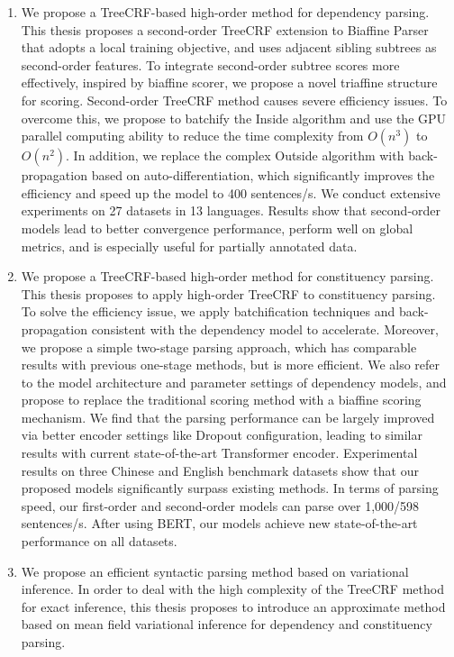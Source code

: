 \begin{eabstract}
	\begin{enumerate}
		\item We propose a TreeCRF-based high-order method for dependency parsing.
		      This thesis proposes a second-order TreeCRF extension to Biaffine Parser that adopts a local training objective, and uses adjacent sibling subtrees as second-order features.
		      To integrate second-order subtree scores more effectively, inspired by biaffine scorer, we propose a novel triaffine structure for scoring.
		      Second-order TreeCRF method causes severe efficiency issues.
		      To overcome this, we propose to batchify the Inside algorithm and use the GPU parallel computing ability to reduce the time complexity from $O(n^3)$ to $O(n^2)$.
		      In addition, we replace the complex Outside algorithm with back-propagation based on auto-differentiation, which significantly improves the efficiency and speed up the model to 400 sentences/s.
		      We conduct extensive experiments on 27 datasets in 13 languages.
		      Results show that second-order models lead to better convergence performance, perform well on global metrics, and is especially useful for partially annotated data.
		\item We propose a TreeCRF-based high-order method for constituency parsing.
		      This thesis proposes to apply high-order TreeCRF to constituency parsing.
		      To solve the efficiency issue, we apply batchification techniques and back-propagation consistent with the dependency model to accelerate.
		      Moreover, we propose a simple two-stage parsing approach, which has comparable results with previous one-stage methods, but is more efficient.
		      We also refer to the model architecture and parameter settings of dependency models, and propose to replace the traditional scoring method with a biaffine scoring mechanism.
		      We find that the parsing performance can be largely improved via better encoder settings like Dropout configuration, leading to similar results with current state-of-the-art Transformer encoder.
		      Experimental results on three Chinese and English benchmark datasets show that our proposed models significantly surpass existing methods.
		      In terms of parsing speed, our first-order and second-order models can parse over 1,000/598 sentences/s.
		      After using BERT, our models achieve new state-of-the-art performance on all datasets.
		\item We propose an efficient syntactic parsing method based on variational inference.
		      In order to deal with the high complexity of the TreeCRF method for exact inference, this thesis proposes to introduce an approximate method based on mean field variational inference for dependency and constituency parsing.

\end{enumerate}
\end{eabstract}
